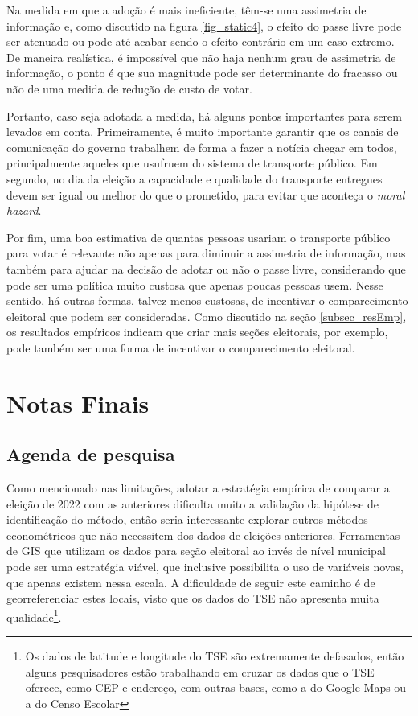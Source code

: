 Na medida em que a adoção é mais ineficiente, têm-se uma assimetria de informação e, como discutido na figura \ref{fig_static4}, o efeito do passe livre pode ser atenuado ou pode até acabar sendo o efeito contrário em um caso extremo. De maneira realística, é impossível que não haja nenhum grau de assimetria de informação, o ponto é que sua magnitude pode ser determinante do fracasso ou não de uma medida de redução de custo de votar.

Portanto, caso seja adotada a medida, há alguns pontos importantes para serem levados em conta. Primeiramente, é muito importante garantir que os canais de comunicação do governo trabalhem de forma a fazer a notícia chegar em todos, principalmente aqueles que usufruem do sistema de transporte público. Em segundo, no dia da eleição a capacidade e qualidade do transporte entregues devem ser igual ou melhor do que o prometido, para evitar que aconteça o \textit{moral hazard}. 

Por fim, uma boa estimativa de quantas pessoas usariam o transporte público para votar é relevante não apenas para diminuir a assimetria de informação, mas também para ajudar na decisão de adotar ou não o passe livre, considerando que pode ser uma política muito custosa que apenas poucas pessoas usem. Nesse sentido, há outras formas, talvez menos custosas, de incentivar o comparecimento eleitoral que podem ser consideradas. Como discutido na seção \ref{subsec_resEmp}, os resultados empíricos indicam que criar mais seções eleitorais, por exemplo, pode também ser uma forma de incentivar o comparecimento eleitoral. 

\section{Notas Finais}
\label{sec_notas}

\subsection{Agenda de pesquisa}

Como mencionado nas limitações, adotar a estratégia empírica de comparar a eleição de 2022 com as anteriores dificulta muito a validação da hipótese de identificação do método, então seria interessante explorar outros métodos econométricos que não necessitem dos dados de eleições anteriores. Ferramentas de GIS que utilizam os dados para seção eleitoral ao invés de nível municipal pode ser uma estratégia viável, que inclusive possibilita o uso de variáveis novas, que apenas existem nessa escala. A dificuldade de seguir este caminho é de georreferenciar estes locais, visto que os dados do TSE não apresenta muita qualidade\footnote{Os dados de latitude e longitude do TSE são extremamente defasados, então alguns pesquisadores estão trabalhando em cruzar os dados que o TSE oferece, como CEP e endereço, com outras bases, como a do Google Maps ou a do Censo Escolar}. 

